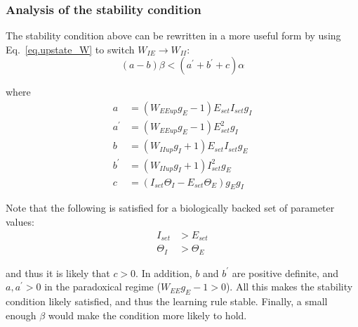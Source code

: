 \documentclass[
twocolumn,
]{article}
\newcommand{\EE}{\mathit{EE}}
\newcommand{\IE}{\mathit{IE}}
\newcommand{\II}{\mathit{II}}
\newcommand{\set}{\mathit{set}}
\newcommand{\up}{\mathit{up}}
\begin{document}
\subsubsection{Analysis of the stability condition}

The stability condition above can be rewritten in a more useful form by using Eq.\ \ref{eq.upstate_W} to switch $W_{\IE} \rightarrow W_{\II}$:
\begin{equation}
(a - b)\beta < (a^\prime + b^\prime + c) \alpha
\end{equation}

\noindent where
\begin{displaymath}
\begin{aligned}
a & = (W_{\EE\up}g_E - 1) E_{\set} I_{\set} g_I \\
a^\prime & = (W_{\EE\up}g_E - 1)E_{\set}^2 g_I \\
b & = (W_{\II\up}g_I + 1) E_{\set} I_{\set} g_E \\
b^\prime & = (W_{\II\up}g_I + 1)I_{\set}^2 g_E \\
c & = (I_{\set}\Theta_I - E_{\set}\Theta_E)g_E g_I
\end{aligned}
\end{displaymath}

\noindent Note that the following is satisfied for a biologically backed set of parameter values:
\begin{displaymath}
\begin{aligned}
I_{\set} & > E_{\set} \\
\Theta_I & > \Theta_E
\end{aligned}
\end{displaymath}

\noindent and thus it is likely that $c>0$. In addition, $b$ and $b^\prime$ are positive definite, and $a,a^\prime>0$ in the paradoxical regime ($W_{\EE}g_E - 1 > 0$). All this makes the stability condition likely satisfied, and thus the learning rule stable. Finally, a small enough $\beta$ would make the condition more likely to hold.
\end{document}
